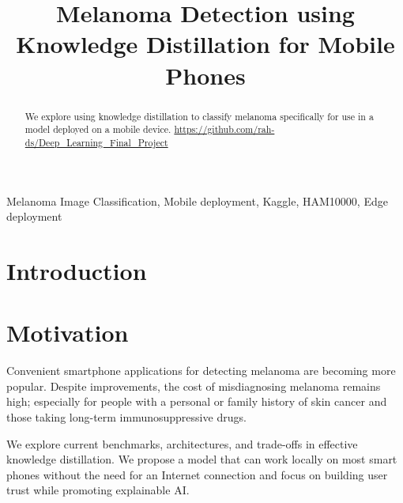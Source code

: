 \documentclass[conference]{IEEEtran}
\begin{document}
\title{Melanoma Detection using Knowledge Distillation for Mobile Phones}


\author{
\and
{}
}

\maketitle

\begin{abstract}
We explore using knowledge distillation to classify melanoma specifically for use in a model deployed on a mobile device.
\url{https://github.com/rah-ds/Deep_Learning_Final_Project}
\end{abstract}

\begin{IEEEkeywords}
Melanoma Image Classification, Mobile deployment, Kaggle, HAM10000, Edge deployment
\end{IEEEkeywords}

\section{Introduction}



\maketitle

\section*{Motivation}

Convenient smartphone applications for detecting melanoma are becoming more popular. Despite improvements, the cost of misdiagnosing melanoma remains high; especially for people with a personal or family history of skin cancer and those taking long-term immunosuppressive drugs. 

We explore current benchmarks, architectures, and trade-offs in effective knowledge distillation. We propose a model that can work locally on most smart phones without the need for an Internet connection and focus on building user trust while promoting explainable AI.
\end{document}
